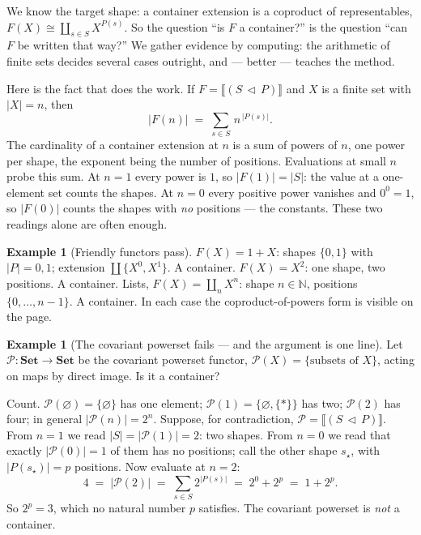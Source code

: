 \documentclass[11pt]{article}
\theoremstyle{plain}
\theoremstyle{definition}
\newtheorem{example}[theorem]{Example}
\newcommand{\Set}{\mathbf{Set}}
\newcommand{\iso}{\cong}
\newcommand{\ext}[1]{\llbracket #1 \rrbracket}
\newcommand{\cont}[2]{(#1\,\triangleleft\,#2)}
\begin{document}
We know the target shape: a container extension is a coproduct of representables,
$F(X)\iso\coprod_{s\in S}X^{P(s)}$. So the question ``is $F$ a container?'' is the
question ``can $F$ be written that way?'' We gather evidence by computing: the
arithmetic of finite sets decides several cases outright, and --- better --- teaches
the method.

Here is the fact that does the work. If $F=\ext{\cont SP}$ and $X$ is a finite set with
$|X|=n$, then
\[
  |F(n)| \;=\; \sum_{s\in S}\,n^{\,|P(s)|}.
\]
The cardinality of a container extension at $n$ is a sum of powers of $n$, one power
per shape, the exponent being the number of positions. Evaluations at small $n$ probe
this sum. At $n=1$ every power is $1$, so $|F(1)|=|S|$: the value at a one-element set
counts the shapes. At $n=0$ every positive power vanishes and $0^0=1$, so $|F(0)|$
counts the shapes with \emph{no} positions --- the constants. These two readings alone
are often enough.

\begin{example}[Friendly functors pass]\label{ex:pass}
$F(X)=1+X$: shapes $\{0,1\}$ with $|P|=0,1$; extension $\coprod\{X^0,X^1\}$. A
container. $F(X)=X^2$: one shape, two positions. A container. Lists,
$F(X)=\coprod_{n}X^{n}$: shape $n\in\mathbb N$, positions $\{0,\dots,n-1\}$. A
container. In each case the coproduct-of-powers form is visible on the page.
\end{example}

\begin{example}[The covariant powerset fails --- and the argument is one line]
\label{ex:powerset}
Let $\mathcal P\colon\Set\to\Set$ be the covariant powerset functor, $\mathcal
P(X)=\{\text{subsets of }X\}$, acting on maps by direct image. Is it a container?

Count. $\mathcal P(\varnothing)=\{\varnothing\}$ has one element; $\mathcal
P(1)=\{\varnothing,\{*\}\}$ has two; $\mathcal P(2)$ has four; in general $|\mathcal
P(n)|=2^{n}$. Suppose, for contradiction, $\mathcal P=\ext{\cont SP}$. From $n=1$ we
read $|S|=|\mathcal P(1)|=2$: two shapes. From $n=0$ we read that exactly $|\mathcal
P(0)|=1$ of them has no positions; call the other shape $s_\star$, with $|P(s_\star)|=p$
positions. Now evaluate at $n=2$:
\[
  4 \;=\; |\mathcal P(2)| \;=\; \sum_{s\in S} 2^{|P(s)|}
        \;=\; 2^{0} + 2^{p} \;=\; 1 + 2^{p}.
\]
So $2^{p}=3$, which no natural number $p$ satisfies. The covariant powerset is
\emph{not} a container.
\end{example}
\end{document}
